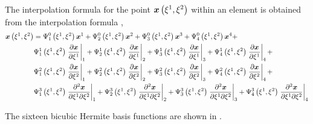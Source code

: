The interpolation formula for the point
$\fnof{\vect{x}}{\xione,\xitwo}$ within an element is obtained from the
\bicubicherm interpolation formula \citep{nielsen:1991a}, 
\begin{equation}
  \begin{split}
    \fnof{\vect{x}}{\xione,\xitwo} &=
    \chbfn{1}{0}{\xione,\xitwo}\nodept{\vect{x}}{1} +
    \chbfn{2}{0}{\xione,\xitwo}\nodept{\vect{x}}{2} +
    \chbfn{3}{0}{\xione,\xitwo}\nodept{\vect{x}}{3} +
    \chbfn{4}{0}{\xione,\xitwo}\nodept{\vect{x}}{4} + \\
    & \chbfn{1}{1}{\xione,\xitwo}\evalat{\delby{\vect{x}}{\xione}}{1}+
    \chbfn{2}{1}{\xione,\xitwo}\evalat{\delby{\vect{x}}{\xione}}{2}+ 
    \chbfn{3}{1}{\xione,\xitwo}\evalat{\delby{\vect{x}}{\xione}}{3}+
    \chbfn{4}{1}{\xione,\xitwo}\evalat{\delby{\vect{x}}{\xione}}{4} + \\ 
    & \chbfn{1}{2}{\xione,\xitwo}\evalat{\delby{\vect{x}}{\xitwo}}{1}+
    \chbfn{2}{2}{\xione,\xitwo}\evalat{\delby{\vect{x}}{\xitwo}}{2} + 
    \chbfn{3}{2}{\xione,\xitwo}\evalat{\delby{\vect{x}}{\xitwo}}{3}+
    \chbfn{4}{2}{\xione,\xitwo}\evalat{\delby{\vect{x}}{\xitwo}}{4} + \\ 
    & \chbfn{1}{3}{\xione,\xitwo}\evalat{\deltwoby{\vect{x}}{\xione}{\xitwo}}{1} +
    \chbfn{2}{3}{\xione,\xitwo}\evalat{\deltwoby{\vect{x}}{\xione}{\xitwo}}{2} +
    \chbfn{3}{3}{\xione,\xitwo}\evalat{\deltwoby{\vect{x}}{\xione}{\xitwo}}{3} + 
    \chbfn{4}{3}{\xione,\xitwo}\evalat{ \deltwoby{\vect{x}}{\xione}{\xitwo}}{4}    
  \end{split}
  \label{eqn:bichxiinterp}
\end{equation}

The sixteen \twodal bicubic Hermite basis functions are shown in .
            
